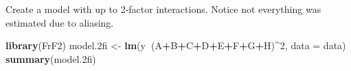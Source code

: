 \documentclass[]{article}
\newenvironment{Shaded}{\begin{snugshade}}{\end{snugshade}}
\newcommand{\DataTypeTok}[1]{\textcolor[rgb]{0.13,0.29,0.53}{#1}}
\newcommand{\DecValTok}[1]{\textcolor[rgb]{0.00,0.00,0.81}{#1}}
\newcommand{\FloatTok}[1]{\textcolor[rgb]{0.00,0.00,0.81}{#1}}
\newcommand{\KeywordTok}[1]{\textcolor[rgb]{0.13,0.29,0.53}{\textbf{#1}}}
\newcommand{\NormalTok}[1]{#1}
\newcommand{\OperatorTok}[1]{\textcolor[rgb]{0.81,0.36,0.00}{\textbf{#1}}}
\newcommand{\StringTok}[1]{\textcolor[rgb]{0.31,0.60,0.02}{#1}}
\begin{document}
\begin{Shaded}
\begin{Highlighting}[]
{\NormalTok{H <-}\StringTok{ }\KeywordTok{factor}\NormalTok{(data}\OperatorTok{$}\NormalTok{H, }\DataTypeTok{levels =} \KeywordTok{c}\NormalTok{(}\OperatorTok{-}\DecValTok{1}\NormalTok{,}\DecValTok{1}\NormalTok{), }\DataTypeTok{labels =} \KeywordTok{c}\NormalTok{(}\StringTok{"Low"}\NormalTok{, }\StringTok{"High"}\NormalTok{))}
\NormalTok{y <-}\StringTok{ }\NormalTok{data}\OperatorTok{$}\NormalTok{y}
\end{Highlighting}
\end{Shaded}

Create a model with up to 2-factor interactions. Notice not everything
was estimated due to aliasing.

\begin{Shaded}
\begin{Highlighting}[]
\KeywordTok{library}\NormalTok{(FrF2)}
\NormalTok{model}\FloatTok{.2}\NormalTok{fi <-}\StringTok{ }\KeywordTok{lm}\NormalTok{(y}\OperatorTok{~}\NormalTok{(A}\OperatorTok{+}\NormalTok{B}\OperatorTok{+}\NormalTok{C}\OperatorTok{+}\NormalTok{D}\OperatorTok{+}\NormalTok{E}\OperatorTok{+}\NormalTok{F}\OperatorTok{+}\NormalTok{G}\OperatorTok{+}\NormalTok{H)}\OperatorTok{^}\DecValTok{2}\NormalTok{, }\DataTypeTok{data =}\NormalTok{ data) }
\KeywordTok{summary}\NormalTok{(model}\FloatTok{.2}\NormalTok{fi)}
\end{Highlighting}
\end{Shaded}
\end{document}
